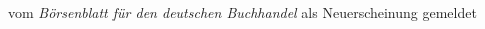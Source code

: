 \begin{ledgroupsized}[t]{13cm}
{{{{{                                vom \emph{Börsenblatt für den deutschen
                                    Buchhandel} als Neuerscheinung gemeldet}}}\label{K_L01100_1h}}}\pend
                     \endnumbering{}\end{ledgroupsized}  \newcommand{\dateiname}{L01100}\newcommand{\titel}{Arthur Schnitzler: Widmungsexemplar Der Schleier der Beatrice für Hugo von Hofmannsthal, 28. 2. 1901}\newcommand{\editorInnen}{Martin Anton Müller und Gerd-Hermann Susen}
            \footnotesize
\begin{ledgroupsized}[t]{11.5cm}
\end{ledgroupsized}
         
      